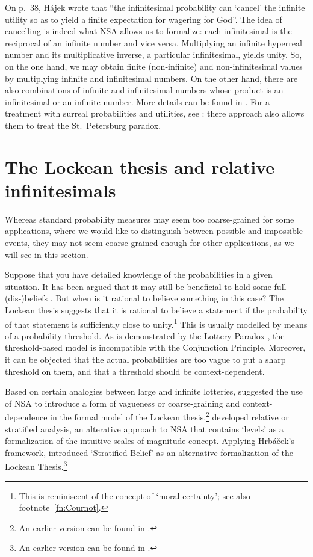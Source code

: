 On p.~38, H\'ajek wrote that ``the infinitesimal probability can `cancel' the infinite utility so as to yield a finite expectation for wagering for God''.
The idea of cancelling is indeed what NSA allows us to formalize: each infinitesimal is the reciprocal of an infinite number and vice versa. Multiplying an infinite hyperreal number and its multiplicative inverse, a particular infinitesimal, yields unity. So, on the one hand, we may obtain finite (non-infinite) and non-infinitesimal values by multiplying infinite and infinitesimal numbers. On the other hand, there are also combinations of infinite and infinitesimal numbers whose product is an infinitesimal or an infinite number. More details can be found in \citet{Wenmackers:forthc}. For a treatment with surreal probabilities and utilities, see \citet{ChenRubio:forthc}: there approach also allows them to treat the St.~Petersburg paradox.

\section{The Lockean thesis and relative infinitesimals}\label{sec:LT}
Whereas standard probability measures may seem too coarse-grained for some applications, where we would like to distinguish between possible and impossible events, they may not seem coarse-grained enough for other applications, as we will see in this section.

Suppose that you have detailed knowledge of the probabilities in a given situation. It has been argued that it may still be beneficial to hold some full (dis-)beliefs \citep{Foley:2009}. But when is it rational to believe something in this case? The Lockean thesis suggests that it is rational to believe a statement if the probability of that statement is sufficiently close to unity.\footnote{This is reminiscent of the concept of `moral certainty'; see also footnote~\ref{fn:Cournot}.} This is usually modelled by means of a probability threshold. As is demonstrated by the Lottery Paradox \citep{Kyburg:1961}, the threshold-based model is incompatible with the Conjunction Principle. Moreover, it can be objected that the actual probabilities are too vague to put a sharp threshold on them, and that a threshold should be context-dependent.

Based on certain analogies between large and infinite lotteries, \citet{Wenmackers:2012f} suggested the use of NSA to introduce a form of vagueness or coarse-graining and context-dependence in the formal model of the Lockean thesis.\footnote{An earlier version can be found in \citet[Ch.~4]{Wenmackers:2011a}.} \citet{Hrbacek:2007} developed relative or stratified analysis, an alterative approach to NSA that contains `levels' as a formalization of the intuitive scales-of-magnitude concept. Applying Hrb\'{a}\v{c}ek's framework, \citet{Wenmackers:2013} introduced `Stratified Belief' as an alternative formalization of the Lockean Thesis.\footnote{An earlier version can be found in \citet[Ch.~3]{Wenmackers:2011a}.}

